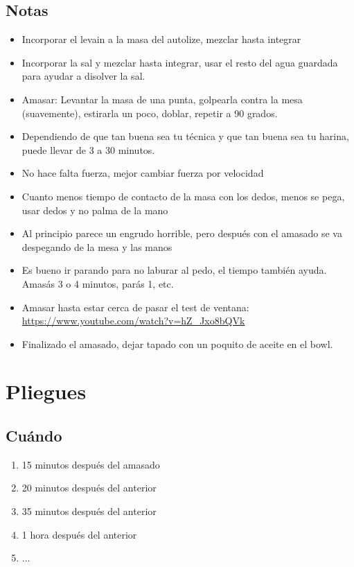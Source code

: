\documentclass[10pt,a4paper]{article}
\begin{document}
\subsection*{Notas}
\begin{itemize}
\item Incorporar el levain a la masa del autolize, mezclar hasta integrar
\item Incorporar la sal y mezclar hasta integrar, usar el resto del agua
  guardada para ayudar a disolver la sal.
\item Amasar: Levantar la masa de una punta, golpearla contra la mesa (suavemente),
  estirarla un poco, doblar, repetir a 90 grados.
\item Dependiendo de que tan buena sea tu técnica y que tan buena sea tu
  harina, puede llevar de 3 a 30 minutos.
\item No hace falta fuerza, mejor cambiar fuerza por velocidad
\item Cuanto menos tiempo de contacto de la masa  con los dedos,
  menos se pega, usar dedos y no palma de la mano
\item Al principio parece un engrudo horrible, pero después con
  el amasado se va despegando de la mesa y las manos
\item Es bueno ir parando para no laburar al pedo, el tiempo también ayuda.
  Amasás 3 o 4 minutos, parás 1, etc.
\item Amasar hasta estar cerca de pasar el test de ventana:
  \url{https://www.youtube.com/watch?v=hZ_Jxo8bQVk}
\item Finalizado el amasado, dejar tapado con un poquito de aceite
  en el bowl.

\end{itemize}

\section{Pliegues}
\subsection*{Cuándo}
\begin{enumerate}
\item 15 minutos después del amasado
\item 20 minutos después del anterior
\item 35 minutos después del anterior
\item 1 hora después del anterior
\item ...
\end{enumerate}
\end{document}
